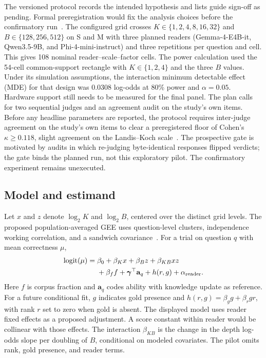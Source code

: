 The versioned protocol records the intended hypothesis and lists guide sign-off as pending. Formal preregistration would fix the analysis choices before the confirmatory run~\cite{article2018preregistration}. The configured grid crosses $K\in\{1,2,4,8,16,32\}$ and $B\in\{128,256,512\}$ on S and M with three planned readers (Gemma-4-E4B-it, Qwen3.5-9B, and Phi-4-mini-instruct) and three repetitions per question and cell. This gives 108 nominal reader--scale--factor cells. The power calculation used the 54-cell common-support rectangle with $K\in\{1,2,4\}$ and the three $B$ values. Under its simulation assumptions, the interaction minimum detectable effect (MDE) for that design was 0.0308 log-odds at 80\% power and $\alpha=0.05$. Hardware support still needs to be measured for the final panel. The plan calls for two sequential judges and an agreement audit on the study's own items. Before any headline parameters are reported, the protocol requires inter-judge agreement on the study's own items to clear a preregistered floor of Cohen's $\kappa\ge0.118$, slight agreement on the Landis--Koch scale~\cite{landis1977measurement}. The prospective gate is motivated by audits in which re-judging byte-identical responses flipped verdicts; the gate binds the planned run, not this exploratory pilot. The confirmatory experiment remains unexecuted.

\subsection{Model and estimand}

Let $x$ and $z$ denote $\log_2 K$ and $\log_2 B$, centered over the distinct grid levels. The proposed population-averaged GEE uses question-level clusters, independence working correlation, and a sandwich covariance~\cite{liang1986longitudinal}. For a trial on question $q$ with mean correctness $\mu$,
\begin{equation}
\begin{aligned}
\mathrm{logit}(\mu)={}&\beta_0+\beta_Kx+\beta_Bz+\beta_{KB}xz\\
&+\beta_f f+\boldsymbol\gamma^\top\mathbf a_q+h(r,g)+\alpha_{\rm reader}.
\end{aligned}
\label{eq:model}
\end{equation}
Here $f$ is corpus fraction and $\mathbf a_q$ codes ability with knowledge update as reference. For a future conditional fit, $g$ indicates gold presence and $h(r,g)=\beta_g g+\beta_r gr$, with rank $r$ set to zero when gold is absent. The displayed model uses reader fixed effects as a proposed adjustment. A score constant within reader would be collinear with those effects. The interaction $\beta_{KB}$ is the change in the depth log-odds slope per doubling of $B$, conditional on modeled covariates. The pilot omits rank, gold presence, and reader terms.

